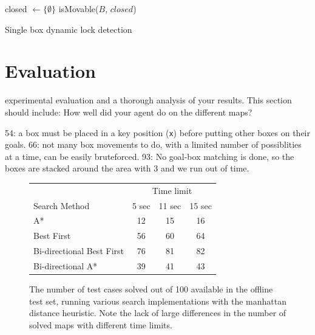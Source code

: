 \documentclass[a4paper,11pt]{article}
\begin{document}
\begin{algorithm}
  \DontPrintSemicolon
  closed $\longleftarrow \{\emptyset\}$\;
  \Return isMovable($B$, $closed$)

\caption{Single box dynamic lock detection}
\label{alg:singledynamiclock}
\end{algorithm}

\section{Evaluation}
experimental evaluation and a thorough analysis of your results. This section should include:
How well did your agent do on the different maps?

54: a box must be placed in a key position (\texttt{x}) before putting other boxes on their goals. 66: not many box movements to do, with a limited number of possiblities at a time, can be easily bruteforced. 93: No goal-box matching is done, so the boxes are stacked around the area with 3  and we run out of time.

\begin{figure}
  \centering
  \begin{tabular}{lccc}
    & \multicolumn{3}{c}{Time limit}\\
    \cline{2-4}
    Search Method              &  5 sec  &  11 sec  &  15 sec  \\
    \hline
    A*                         &     12  &      15  &      16  \\
    Best First                 &     56  &      60  &      64  \\
    Bi-directional Best First  &     76  &      81  &      82  \\
    Bi-directional A*          &     39  &      41  &      43  \\
  \end{tabular}

  \caption{The number of test cases solved out of 100 available in the offline
    test set, running various search implementations with the manhattan distance
    heuristic. Note the lack of large differences in the number of solved maps
    with different time limits.}
  \label{fig:passedtests}
\end{figure}
\end{document}
